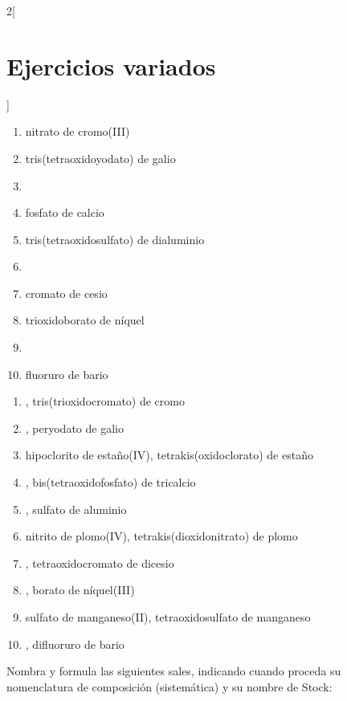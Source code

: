 \documentclass[10pt]{article}
\begin{document}
\begin{multicols*}{2}[
  \section{Ejercicios variados}
  ]
\begin{exercise}[
    tags    = {inorgánica,sales, sales binarias,sales ternarias},
    topics  = {química inorgánica,formulación,nomenclatura},
    source  = {SAN Formulación, p29, e38},
  ]
  \begin{enumerate}
    \item nitrato de cromo(III)
    \item tris(tetraoxidoyodato) de galio
    \item {}
    \item fosfato de calcio
    \item tris(tetraoxidosulfato) de dialuminio
    \item {}
    \item cromato de cesio
    \item trioxidoborato de níquel
    \item {}
    \item fluoruro de bario
  \end{enumerate}
\end{exercise}

\begin{solution}
  \begin{enumerate}
    \item {}, tris(trioxidocromato) de cromo
    \item {}, peryodato de galio
    \item hipoclorito de estaño(IV), tetrakis(oxidoclorato) de estaño
    \item {}, bis(tetraoxidofosfato) de tricalcio
    \item {}, sulfato de aluminio
    \item nitrito de plomo(IV), tetrakis(dioxidonitrato) de plomo
    \item {}, tetraoxidocromato de dicesio
    \item {}, borato de níquel(III)
    \item sulfato de manganeso(II), tetraoxidosulfato de manganeso
    \item {}, difluoruro de bario
  \end{enumerate}
\end{solution}




\begin{exercise}[
    tags    = {inorgánica,sales,sales binarias,sales ternarias},
    topics  = {química inorgánica,formulación,nomenclatura},
    source  = {SAN Formulación, p29, e39},
  ]
  Nombra y formula las siguientes sales, indicando cuando proceda su nomenclatura de composición (sistemática) y su nombre de Stock:


\end{exercise}
\end{multicols*}
\end{document}
